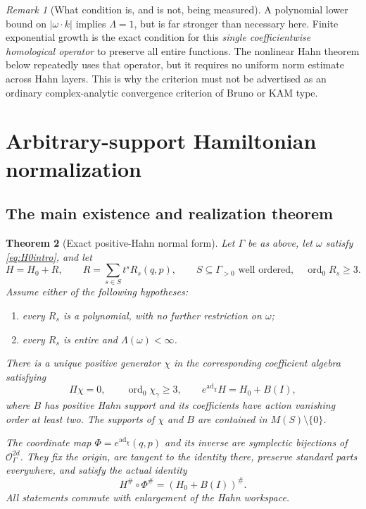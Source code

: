 \documentclass[11pt,letterpaper]{article}
\numberwithin{equation}{section}
\newtheorem{theorem}{Theorem}[section]
\theoremstyle{definition}
\theoremstyle{remark}
\newtheorem{remark}[theorem]{Remark}
\newcommand{\OO}{\mathcal O}
\newcommand{\ad}{\operatorname{ad}}
\newcommand{\ord}{\operatorname{ord}}
\begin{document}
\begin{remark}[What condition is, and is not, being measured]
A polynomial lower bound on $|\omega\cdot k|$ implies $\Lambda=1$, but is
far stronger than necessary here. Finite exponential growth is the exact
condition for this \emph{single coefficientwise homological operator} to
preserve all entire functions. The nonlinear Hahn theorem below repeatedly
uses that operator, but it requires no uniform norm estimate across Hahn
layers. This is why the criterion must not be advertised as an ordinary
complex-analytic convergence criterion of Bruno or KAM type.
\end{remark}

\section{Arbitrary-support Hamiltonian normalization}
\label{sec:normalform}

\subsection{The main existence and realization theorem}
\begin{theorem}[Exact positive-Hahn normal form]\label{thm:normalform}
Let $\Gamma$ be as above, let $\omega$ satisfy \eqref{eq:H0intro}, and let
\begin{equation}\label{eq:Hinput}
 H=H_0+R,\qquad
 R=\sum_{s\in S}t^s R_s(q,p),\qquad
 S\subseteq\Gamma_{>0}\text{ well ordered},\quad \ord_0 R_s\ge3.
\end{equation}
Assume either of the following hypotheses:
\begin{enumerate}[label=(\alph*)]
\item every $R_s$ is a polynomial, with no further restriction on $\omega$;
\item every $R_s$ is entire and $\Lambda(\omega)<\infty$.
\end{enumerate}
There is a unique positive generator $\chi$ in the corresponding coefficient
algebra satisfying
\begin{equation}\label{eq:gauge}
 \Pi\chi=0,\qquad \ord_0\chi_\gamma\ge3,
 \qquad e^{\ad_\chi}H=H_0+B(I),
\end{equation}
where $B$ has positive Hahn support and its coefficients have action
vanishing order at least two. The supports of $\chi$ and $B$ are contained
in $M(S)\setminus\{0\}$.

The coordinate map $\Phi=e^{\ad_\chi}(q,p)$ and its inverse are symplectic
bijections of $\OO_\Gamma^{2d}$. They fix the origin, are tangent to the
identity there, preserve standard parts everywhere, and satisfy the actual
identity
\begin{equation}\label{eq:actualnormal}
 H^\#\circ\Phi^\#=(H_0+B(I))^\#.
\end{equation}
All statements commute with enlargement of the Hahn workspace.
\end{theorem}
\end{document}

